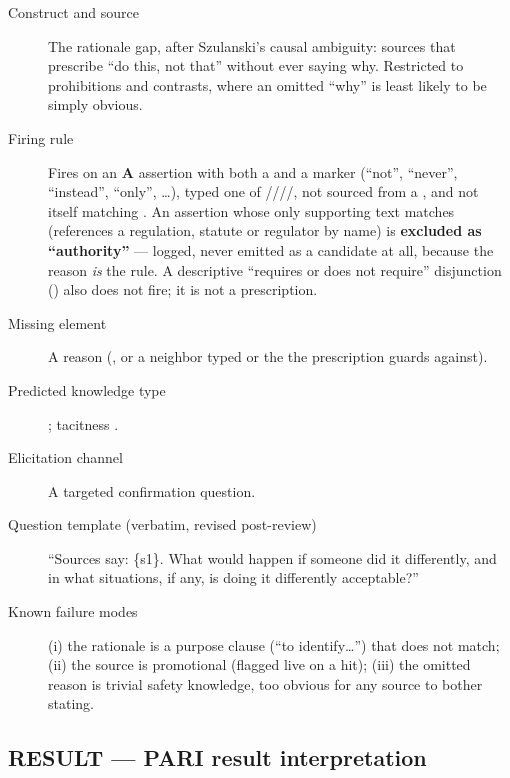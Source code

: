 \begin{description}
  \item[Construct and source] The rationale gap, after Szulanski's causal ambiguity: sources that
    prescribe \enquote{do this, not that} without ever saying why. Restricted to prohibitions and
    contrasts, where an omitted \enquote{why} is least likely to be simply obvious.
  \item[Firing rule] Fires on an \textbf{A} assertion with both a  and a 
    marker (\enquote{not}, \enquote{never}, \enquote{instead}, \enquote{only}, \ldots), typed one
    of /\allowbreak{}/\allowbreak{}/\allowbreak{}/\allowbreak{}, not sourced
    from a , and not itself matching . An assertion whose only supporting
    text matches  (references a regulation, statute or regulator by name) is
    \textbf{excluded as \enquote{authority}} --- logged, never emitted as a candidate at all,
    because the reason \emph{is} the rule. A descriptive \enquote{requires or does not require}
    disjunction () also does not fire; it is not a prescription.
  \item[Missing element] A reason (, or a neighbor typed  or the
     the prescription guards against).
  \item[Predicted knowledge type] ; tacitness .
  \item[Elicitation channel] A targeted confirmation question.
  \item[Question template (verbatim, revised post-review)] \enquote{Sources say:
    \textquotedbl\{s1\}\textquotedbl. What would happen if someone did it differently, and in what
    situations, if any, is doing it differently acceptable?}
  \item[Known failure modes] (i) the rationale is a purpose clause (\enquote{to identify\ldots})
    that  does not match; (ii) the source is promotional (flagged live on a
     hit); (iii) the omitted reason is trivial safety knowledge, too obvious for any
    source to bother stating.
\end{description}

\subsection{RESULT --- PARI result interpretation}

